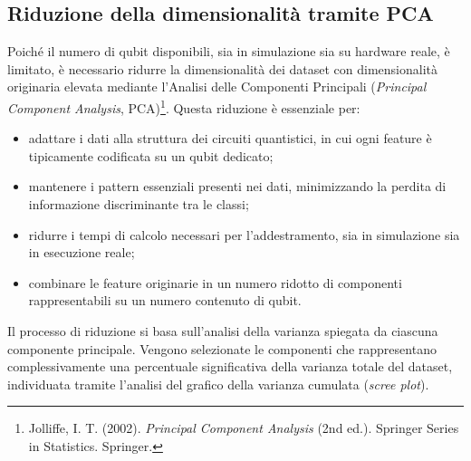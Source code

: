 \subsection{Riduzione della dimensionalità tramite PCA}
\label{sec:pca}
Poiché il numero di qubit disponibili, sia in simulazione sia su hardware reale, è limitato, è necessario ridurre la dimensionalità dei dataset con dimensionalità originaria elevata mediante l'Analisi delle Componenti Principali (\textit{Principal Component Analysis}, PCA)\footnote{Jolliffe, I. T. (2002). \textit{Principal Component Analysis} (2nd ed.). Springer Series in Statistics. Springer.}. Questa riduzione è essenziale per:
\begin{itemize}
    \item adattare i dati alla struttura dei circuiti quantistici, in cui ogni feature è tipicamente codificata su un qubit dedicato;
    \item mantenere i pattern essenziali presenti nei dati, minimizzando la perdita di informazione discriminante tra le classi;
    \item ridurre i tempi di calcolo necessari per l'addestramento, sia in simulazione sia in esecuzione reale;
    \item combinare le feature originarie in un numero ridotto di componenti rappresentabili su un numero contenuto di qubit.
\end{itemize}

Il processo di riduzione si basa sull'analisi della varianza spiegata da ciascuna componente principale. Vengono selezionate le componenti che rappresentano complessivamente una percentuale significativa della varianza totale del dataset, individuata tramite l'analisi del grafico della varianza cumulata (\textit{scree plot}).

